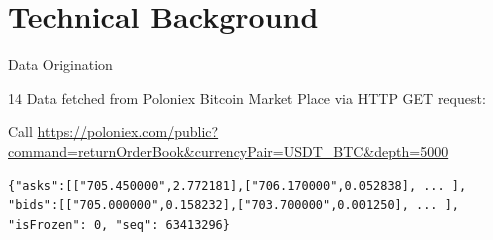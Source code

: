\documentclass[10pt]{beamer}
\begin{document}
\section{Technical Background}

\begin{frame}[fragile]{Data Origination}
\begin{overlayarea}{\textwidth}{14\baselineskip}
  Data fetched from Poloniex Bitcoin Market Place via HTTP GET request:
  
  \footnotesize{Call \url{https://poloniex.com/public?command=returnOrderBook&currencyPair=USDT_BTC&depth=5000}}

  \begin{lstlisting}[frame=single, breaklines=true, basicstyle=\footnotesize, belowskip=-1.0 \baselineskip]
{"asks":[["705.450000",2.772181],["706.170000",0.052838], ... ], "bids":[["705.000000",0.158232],["703.700000",0.001250], ... ], "isFrozen": 0, "seq": 63413296}  \end{lstlisting}
\end{overlayarea}
\end{frame}
\end{document}
